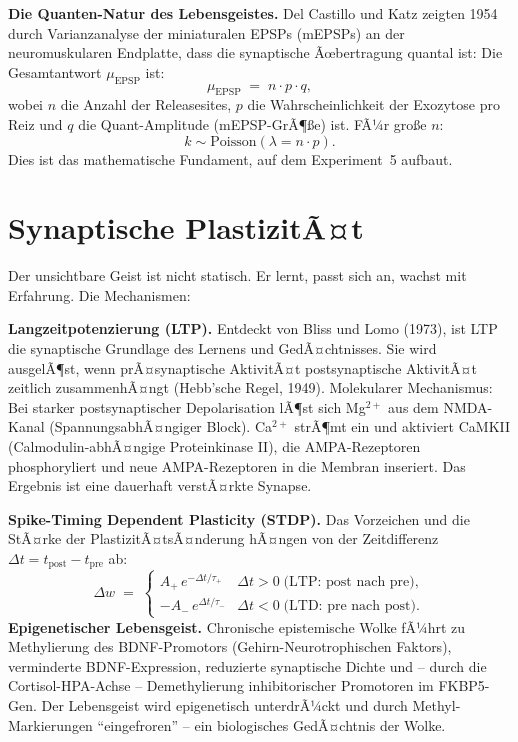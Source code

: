 ﻿\documentclass[12pt,a4paper]{report}
\theoremstyle{plain}
\theoremstyle{definition}
\theoremstyle{remark}
\begin{document}
	\textbf{Die Quanten-Natur des Lebensgeistes.}
	Del Castillo und Katz zeigten 1954 durch Varianzanalyse der miniaturalen
	EPSPs (mEPSPs) an der neuromuskularen Endplatte, dass die synaptische
	Ãœbertragung quantal ist: Die Gesamtantwort $\mu_{\mathrm{EPSP}}$ ist:
	\[
	\mu_{\mathrm{EPSP}} \;=\; n \cdot p \cdot q,
	\]
	wobei $n$ die Anzahl der Releasesites, $p$ die
	Wahrscheinlichkeit der Exozytose pro Reiz und $q$ die
	Quant-Amplitude (mEPSP-GrÃ¶\ss{}e) ist. FÃ¼r gro\ss{}e $n$:
	\[
	k \sim \mathrm{Poisson}(\lambda = n \cdot p).
	\]
	Dies ist das mathematische Fundament, auf dem Experiment~5 aufbaut.
	
	\section{Synaptische PlastizitÃ¤t}
	
	Der unsichtbare Geist ist nicht statisch. Er lernt, passt sich an,
	wachst mit Erfahrung. Die Mechanismen:
	
	\textbf{Langzeitpotenzierung (LTP).}
	Entdeckt von Bliss und Lomo (1973), ist LTP die synaptische Grundlage
	des Lernens und GedÃ¤chtnisses. Sie wird ausgelÃ¶st, wenn
	prÃ¤synaptische AktivitÃ¤t postsynaptische AktivitÃ¤t zeitlich
	zusammenhÃ¤ngt (Hebb'sche Regel, 1949).
	Molekularer Mechanismus: Bei starker postsynaptischer Depolarisation
	lÃ¶st sich Mg$^{2+}$ aus dem NMDA-Kanal (SpannungsabhÃ¤ngiger Block).
	Ca$^{2+}$ strÃ¶mt ein und aktiviert CaMKII (Calmodulin-abhÃ¤ngige
	Proteinkinase II), die AMPA-Rezeptoren phosphoryliert und neue AMPA-Rezeptoren
	in die Membran inseriert. Das Ergebnis ist eine dauerhaft verstÃ¤rkte Synapse.
	
	\textbf{Spike-Timing Dependent Plasticity (STDP).}
	Das Vorzeichen und die StÃ¤rke der PlastizitÃ¤tsÃ¤nderung hÃ¤ngen
	von der Zeitdifferenz $\Delta t = t_{\mathrm{post}} - t_{\mathrm{pre}}$ ab:
	\[
	\Delta w \;=\;
	\begin{cases}
		A_+ \, e^{-\Delta t / \tau_+} & \Delta t > 0 \;\text{(LTP: post nach pre)},\\
		-A_- \, e^{\Delta t  / \tau_-} & \Delta t < 0 \;\text{(LTD: pre nach post)}.
	\end{cases}
	\]
	\textbf{Epigenetischer Lebensgeist.}
	Chronische epistemische Wolke fÃ¼hrt zu Methylierung des BDNF-Promotors
	(Gehirn-Neurotrophischen Faktors), verminderte BDNF-Expression,
	reduzierte synaptische Dichte und -- durch die Cortisol-HPA-Achse --
	Demethylierung inhibitorischer Promotoren im FKBP5-Gen.
	Der Lebensgeist wird epigenetisch unterdrÃ¼ckt und durch Methyl-
	Markierungen ``eingefroren'' -- ein biologisches GedÃ¤chtnis der Wolke.
	
\end{document}

